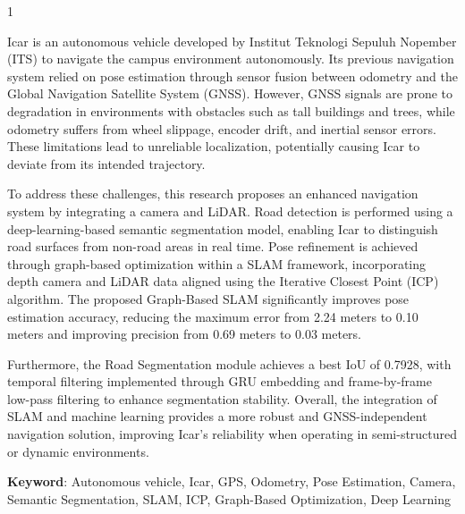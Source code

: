 \begin{spacing}{1}
	
Icar is an autonomous vehicle developed by Institut Teknologi Sepuluh Nopember (ITS) to navigate the campus environment autonomously. Its previous navigation system relied on pose estimation through sensor fusion between odometry and the Global Navigation Satellite System (GNSS). However, GNSS signals are prone to degradation in environments with obstacles such as tall buildings and trees, while odometry suffers from wheel slippage, encoder drift, and inertial sensor errors. These limitations lead to unreliable localization, potentially causing Icar to deviate from its intended trajectory.

To address these challenges, this research proposes an enhanced navigation system by integrating a camera and LiDAR. Road detection is performed using a deep-learning-based semantic segmentation model, enabling Icar to distinguish road surfaces from non-road areas in real time. Pose refinement is achieved through graph-based optimization within a SLAM framework, incorporating depth camera and LiDAR data aligned using the Iterative Closest Point (ICP) algorithm. The proposed Graph-Based SLAM significantly improves pose estimation accuracy, reducing the maximum error from 2.24 meters to 0.10 meters and improving precision from 0.69 meters to 0.03 meters.

Furthermore, the Road Segmentation module achieves a best IoU of 0.7928, with temporal filtering implemented through GRU embedding and frame-by-frame low-pass filtering to enhance segmentation stability. Overall, the integration of SLAM and machine learning provides a more robust and GNSS-independent navigation solution, improving Icar's reliability when operating in semi-structured or dynamic environments.
    

\vspace{2ex}
\textbf{Keyword}: Autonomous vehicle, Icar, GPS, Odometry, Pose Estimation, Camera, Semantic Segmentation, SLAM, ICP, Graph-Based Optimization, Deep Learning
\end{spacing}